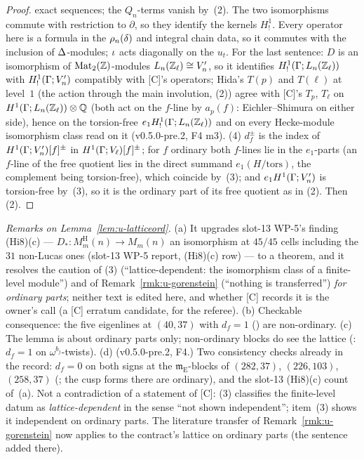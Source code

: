 \documentclass[11pt]{article}
\newcommand{\Eis}{\mathrm{E}}
\newcommand{\Zl}{\Z_\ell}
\begin{document}
\begin{proof}
exact sequences; the $Q_n$-terms vanish by~(2). The two isomorphisms commute with restriction to $\partial$, so they identify the kernels $H^{1}_{!}$. Every operator here is a
formula in the $\rho_n(\delta)$ and integral chain data, so it commutes with the inclusion of $\Delta$-modules; $\iota$ acts diagonally on the $u_t$. For the last sentence: $D$ is an
isomorphism of $\mathrm{Mat}_2(\mathbb{Z})$-modules $L_n(\Zl)\cong V'_n$, so it identifies $H^{1}_{!}(\Ga;L_n(\Zl))$ with $H^{1}_{!}(\Gamma;V'_n)$ compatibly with [C]'s operators; Hida's
$T(p)$ and $T(\ell)$ at level~$1$ (the action through the main involution, (2)) agree with [C]'s $T_p$, $T_\ell$ on $H^{1}(\Ga;L_n(\Zl))\otimes\Q$ (both
act on the $f$-line by $a_p(f)$: Eichler--Shimura on either side), hence on the torsion-free $e_1H^{1}_{!}(\Ga;L_n(\Zl))$ and on every Hecke-module isomorphism class read on
it (v0.5.0-pre.2, F4 m3). (4) $d^{\pm}_f$ is the index of $H^{1}(\Gamma;V'_n)[f]^{\pm}$ in $H^{1}(\Gamma;V_\ell)[f]^{\pm}$;
for $f$ ordinary both $f$-lines lie in the $e_1$-parts (an $f$-line of the free quotient lies in the direct summand $e_1(H/\mathrm{tors})$, the complement being torsion-free),
which coincide by~(3); and $e_1H^{1}(\Gamma;V'_n)$ is torsion-free by~(3), so it is the ordinary part of its free quotient as in (2). Then (2).
\end{proof}

\noindent\emph{Remarks on Lemma~\ref{lem:u-latticeord}.} (a) It upgrades slot-13 WP-5's finding (Hi8)(c) --- $D_\ast\colon M^{\mathrm H}_m(n)\to M_m(n)$ an isomorphism at $45/45$ cells
including the $31$ non-Lucas ones (slot-13 WP-5 report, (Hi8)(c) row) --- to a theorem, and it resolves the caution of (3) (``lattice-dependent: the
isomorphism class of a finite-level module'') and of Remark~\ref{rmk:u-gorenstein} (``nothing is transferred'') \emph{for ordinary parts}; neither text is edited here, and whether [C]
records it is the owner's call (a [C] erratum candidate, for the referee). (b) Checkable consequence: the five eigenlines at $(40,37)$ with $d_f=1$ () are
non-ordinary. (c) The lemma is about ordinary parts only; non-ordinary blocks do see the lattice (: $d_f=1$ on $\omega^{b_j}$-twists). (d) (v0.5.0-pre.2,
F4.) Two consistency checks already in the record: $d_f=0$ on both signs at the $\mathfrak m_\Eis$-blocks of $(282,37)$, $(226,103)$, $(258,37)$ (; the cusp forms
there are ordinary), and the slot-13 (Hi8)(c) count of~(a). Not a contradiction of a statement of [C]: (3) classifies the finite-level datum as
\emph{lattice-dependent} in the sense ``not shown independent''; item~(3) shows it independent on ordinary parts. The literature transfer of Remark~\ref{rmk:u-gorenstein} now
applies to the contract's lattice on ordinary parts (the sentence added there).
\end{document}
